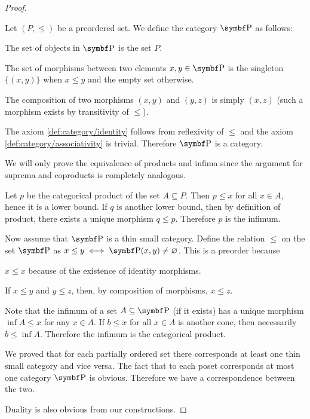 \begin{proof}\mbox{}
  \begin{description}
    \Implies Let \( (P, \leq) \) be a preordered set. We define the category \( \Cat{P} \) as follows:
    \begin{description}
       The set of objects in \( \Cat{P} \) is the set \( P \).

       The set of morphisms between two elements \( x, y \in \Cat{P} \) is the singleton \( \{ (x, y) \} \) when \( x \leq y \) and the empty set otherwise.

       The composition of two morphisms \( (x, y) \) and \( (y, z) \) is simply \( (x, z) \) (such a morphism exists by transitivity of \( \leq \)).
    \end{description}

    The axiom \ref{def:category/identity} follows from reflexivity of \( \leq \) and the axiom \ref{def:category/associativity} is trivial. Therefore \( \Cat{P} \) is a category.

    We will only prove the equivalence of products and infima since the argument for suprema and coproducts is completely analogous.

    Let \( p \) be the categorical product of the set \( A \subseteq P \). Then \( p \leq x \) for all \( x \in A \), hence it is a lower bound. If \( q \) is another lower bound, then by definition of product, there exists a unique morphism \( q \leq p \). Therefore \( p \) is the infimum.

    \ImpliedBy Now assume that \( \Cat{P} \) is a thin small category. Define the relation \( \leq \) on the set \( \Cat{P} \) as \( x \leq y \iff \Cat{P}(x, y) \neq \varnothing \). This is a preorder because
    \begin{description}
       \( x \leq x \) because of the existence of identity morphisms.

       If \( x \leq y \) and \( y \leq z \), then, by composition of morphisms, \( x \leq z \).
    \end{description}

    Note that the infimum of a set \( A \subseteq \Cat{P} \) (if it exists) has a unique morphism \( \inf A \leq x \) for any \( x \in A \). If \( b \leq x \) for all \( x \in A \) is another cone, then necessarily \( b \leq \inf A \). Therefore the infimum is the categorical product.
  \end{description}

  We proved that for each partially ordered set there corresponds at least one thin small category and vice versa. The fact that to each poset corresponds at most one category \( \Cat{P} \) is obvious. Therefore we have a correspondence between the two.

  Duality is also obvious from our constructions.
\end{proof}


